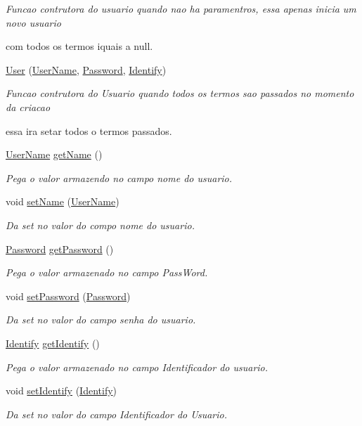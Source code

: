 \begin{DoxyCompactItemize}
\begin{DoxyCompactList}\small\item\em Funcao contrutora do usuario quando nao ha paramentros, essa apenas inicia um novo usuario \par
 com todos os termos iquais a null. \end{DoxyCompactList}\item 
\hyperlink{class_user_a92736dfcd7f82c309c200f4e29473c28}{User} (\hyperlink{class_user_name}{User\-Name}, \hyperlink{class_password}{Password}, \hyperlink{class_identify}{Identify})
\begin{DoxyCompactList}\small\item\em Funcao contrutora do Usuario quando todos os termos sao passados no momento da criacao \par
 essa ira setar todos o termos passados. \end{DoxyCompactList}\item 
\hyperlink{class_user_name}{User\-Name} \hyperlink{class_user_afa0424b01379372bd89045272321cf5d}{get\-Name} ()
\begin{DoxyCompactList}\small\item\em Pega o valor armazendo no campo nome do usuario. \end{DoxyCompactList}\item 
void \hyperlink{class_user_a7f995edfee2b48f8453b5cc15343da79}{set\-Name} (\hyperlink{class_user_name}{User\-Name})
\begin{DoxyCompactList}\small\item\em Da set no valor do compo nome do usuario. \end{DoxyCompactList}\item 
\hyperlink{class_password}{Password} \hyperlink{class_user_abc9521389571e5af24beff8472be7cef}{get\-Password} ()
\begin{DoxyCompactList}\small\item\em Pega o valor armazenado no campo Pass\-Word. \end{DoxyCompactList}\item 
void \hyperlink{class_user_a12140d732c7f6fb6d4069c8a3b3d3bae}{set\-Password} (\hyperlink{class_password}{Password})
\begin{DoxyCompactList}\small\item\em Da set no valor do campo senha do usuario. \end{DoxyCompactList}\item 
\hyperlink{class_identify}{Identify} \hyperlink{class_user_a72672de8bb73d176bf15dee716b563f4}{get\-Identify} ()
\begin{DoxyCompactList}\small\item\em Pega o valor armazenado no campo Identificador do usuario. \end{DoxyCompactList}\item 
void \hyperlink{class_user_a80bc4eeb129fae4db6230e36439ded2d}{set\-Identify} (\hyperlink{class_identify}{Identify})
\begin{DoxyCompactList}\small\item\em Da set no valor do campo Identificador do Usuario. \end{DoxyCompactList}\end{DoxyCompactItemize}


